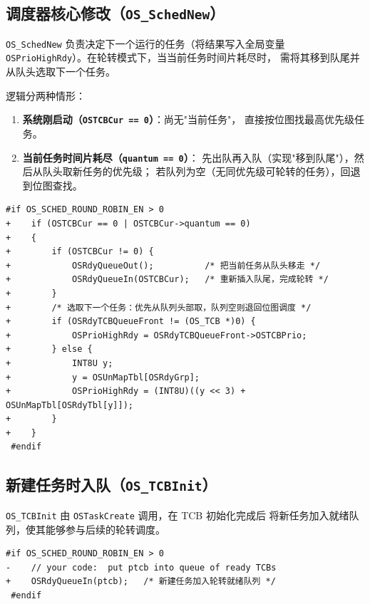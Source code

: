 \documentclass[12pt,a4paper]{article}
\begin{document}
\subsection{调度器核心修改（\texttt{OS\_SchedNew}）}

\texttt{OS\_SchedNew} 负责决定下一个运行的任务（将结果写入全局变量
\texttt{OSPrioHighRdy}）。在轮转模式下，当当前任务时间片耗尽时，
需将其移到队尾并从队头选取下一个任务。

逻辑分两种情形：

\begin{enumerate}
  \item \textbf{系统刚启动（\texttt{OSTCBCur == 0}）}：尚无"当前任务"，
        直接按位图找最高优先级任务。
  \item \textbf{当前任务时间片耗尽（\texttt{quantum == 0}）}：
        先出队再入队（实现"移到队尾"），然后从队头取新任务的优先级；
        若队列为空（无同优先级可轮转的任务），回退到位图查找。
\end{enumerate}

\begin{lstlisting}[style=diffstyle,caption={os\_core.c — OS\_SchedNew 轮转逻辑}]
 #if OS_SCHED_ROUND_ROBIN_EN > 0
+    if (OSTCBCur == 0 | OSTCBCur->quantum == 0)
+    {
+        if (OSTCBCur != 0) {
+            OSRdyQueueOut();          /* 把当前任务从队头移走 */
+            OSRdyQueueIn(OSTCBCur);   /* 重新插入队尾，完成轮转 */
+        }
+        /* 选取下一个任务：优先从队列头部取，队列空则退回位图调度 */
+        if (OSRdyTCBQueueFront != (OS_TCB *)0) {
+            OSPrioHighRdy = OSRdyTCBQueueFront->OSTCBPrio;
+        } else {
+            INT8U y;
+            y = OSUnMapTbl[OSRdyGrp];
+            OSPrioHighRdy = (INT8U)((y << 3) + OSUnMapTbl[OSRdyTbl[y]]);
+        }
+    }
 #endif
\end{lstlisting}

\subsection{新建任务时入队（\texttt{OS\_TCBInit}）}

\texttt{OS\_TCBInit} 由 \texttt{OSTaskCreate} 调用，在 TCB 初始化完成后
将新任务加入就绪队列，使其能够参与后续的轮转调度。

\begin{lstlisting}[style=diffstyle,caption={os\_core.c — 新建任务入就绪队列}]
 #if OS_SCHED_ROUND_ROBIN_EN > 0
-    // your code:  put ptcb into queue of ready TCBs
+    OSRdyQueueIn(ptcb);   /* 新建任务加入轮转就绪队列 */
 #endif
\end{lstlisting}
\end{document}
